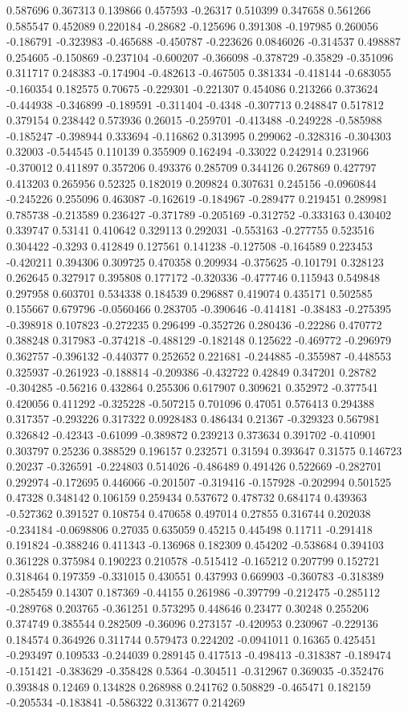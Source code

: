 0.587696 0.367313 0.139866 0.457593 -0.26317 0.510399 0.347658 0.561266 0.585547 0.452089 0.220184 -0.28682 -0.125696 0.391308 -0.197985 0.260056 -0.186791 -0.323983 -0.465688 -0.450787 -0.223626 0.0846026 -0.314537 0.498887 0.254605 -0.150869 -0.237104 -0.600207 -0.366098 -0.378729 -0.35829 -0.351096 0.311717 0.248383 -0.174904 -0.482613 -0.467505 0.381334 -0.418144 -0.683055 -0.160354 0.182575 0.70675 -0.229301 -0.221307 0.454086 0.213266 0.373624 -0.444938 -0.346899 -0.189591 -0.311404 -0.4348 -0.307713 0.248847 0.517812 0.379154 0.238442 0.573936 0.26015 -0.259701 -0.413488 -0.249228 -0.585988 -0.185247 -0.398944 0.333694 -0.116862 0.313995 0.299062 -0.328316 -0.304303 0.32003 -0.544545 0.110139 0.355909 0.162494 -0.33022 0.242914 0.231966 -0.370012 0.411897 0.357206 0.493376 0.285709 0.344126 0.267869 0.427797 0.413203 0.265956 0.52325 0.182019 0.209824 0.307631 0.245156 -0.0960844 -0.245226 0.255096 0.463087 -0.162619 -0.184967 -0.289477 0.219451 0.289981 0.785738 -0.213589 0.236427 -0.371789 -0.205169 -0.312752 -0.333163 0.430402 0.339747 0.53141 0.410642 0.329113 0.292031 -0.553163 -0.277755 0.523516 0.304422 -0.3293 0.412849 0.127561 0.141238 -0.127508 -0.164589 0.223453 -0.420211 0.394306 0.309725 0.470358 0.209934 -0.375625 -0.101791 0.328123 0.262645 0.327917 0.395808 0.177172 -0.320336 -0.477746 0.115943 0.549848 0.297958 0.603701 0.534338 0.184539 0.296887 0.419074 0.435171 0.502585 0.155667 0.679796 -0.0560466 0.283705 -0.390646 -0.414181 -0.38483 -0.275395 -0.398918 0.107823 -0.272235 0.296499 -0.352726 0.280436 -0.22286 0.470772 0.388248 0.317983 -0.374218 -0.488129 -0.182148 0.125622 -0.469772 -0.296979 0.362757 -0.396132 -0.440377 0.252652 0.221681 -0.244885 -0.355987 -0.448553 0.325937 -0.261923 -0.188814 -0.209386 -0.432722 0.42849 0.347201 0.28782 -0.304285 -0.56216 0.432864 0.255306 0.617907 0.309621 0.352972 -0.377541 0.420056 0.411292 -0.325228 -0.507215 0.701096 0.47051 0.576413 0.294388 0.317357 -0.293226 0.317322 0.0928483 0.486434 0.21367 -0.329323 0.567981 0.326842 -0.42343 -0.61099 -0.389872 0.239213 0.373634 0.391702 -0.410901 0.303797 0.25236 0.388529 0.196157 0.232571 0.31594 0.393647 0.31575 0.146723 0.20237 -0.326591 -0.224803 0.514026 -0.486489 0.491426 0.522669 -0.282701 0.292974 -0.172695 0.446066 -0.201507 -0.319416 -0.157928 -0.202994 0.501525 0.47328 0.348142 0.106159 0.259434 0.537672 0.478732 0.684174 0.439363 -0.527362 0.391527 0.108754 0.470658 0.497014 0.27855 0.316744 0.202038 -0.234184 -0.0698806 0.27035 0.635059 0.45215 0.445498 0.11711 -0.291418 0.191824 -0.388246 0.411343 -0.136968 0.182309 0.454202 -0.538684 0.394103 0.361228 0.375984 0.190223 0.210578 -0.515412 -0.165212 0.207799 0.152721 0.318464 0.197359 -0.331015 0.430551 0.437993 0.669903 -0.360783 -0.318389 -0.285459 0.14307 0.187369 -0.44155 0.261986 -0.397799 -0.212475 -0.285112 -0.289768 0.203765 -0.361251 0.573295 0.448646 0.23477 0.30248 0.255206 0.374749 0.385544 0.282509 -0.36096 0.273157 -0.420953 0.230967 -0.229136 0.184574 0.364926 0.311744 0.579473 0.224202 -0.0941011 0.16365 0.425451 -0.293497 0.109533 -0.244039 0.289145 0.417513 -0.498413 -0.318387 -0.189474 -0.151421 -0.383629 -0.358428 0.5364 -0.304511 -0.312967 0.369035 -0.352476 0.393848 0.12469 0.134828 0.268988 0.241762 0.508829 -0.465471 0.182159 -0.205534 -0.183841 -0.586322 0.313677 0.214269 